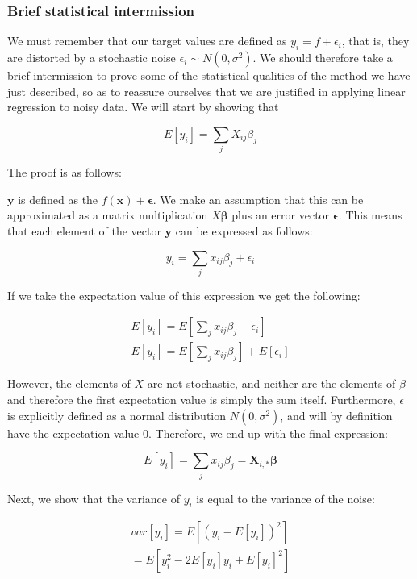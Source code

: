 \documentclass[twocolumn,10pt,cleanfoot]{asme2ej}
\begin{document}
\subsubsection{Brief statistical intermission}

We must remember that our target values are defined as $y_i = f + \epsilon_i$, that is, they are distorted by a stochastic noise $\epsilon_i \sim N(0,\sigma^2)$. We should therefore take a brief intermission to prove some of the statistical qualities of the method we have just described, so as to reassure ourselves that we are justified in applying linear regression to noisy data. We will start by showing that

\begin{equation}
E[y_i] = \sum_j X_{ij}\beta_j
\end{equation}

The proof is as follows:

$\bm{y}$ is defined as the $f(\bm{x}) + \bm{\epsilon}$. We make an assumption that this can be approximated as a matrix multiplication $X\bm{\beta}$ plus an error vector $\bm{\epsilon}$. This means that each element of the vector
$\bm{y}$ can be expressed as follows:

\begin{equation}
y_i = \sum_j x_{ij}\beta_j + \epsilon_i
\end{equation}

If we take the expectation value of this expression we get the following:

\begin{gather}
E[y_i] = E\left[\sum_j x_{ij}\beta_j + \epsilon_i\right] \\
E[y_i] = E\left[\sum_j x_{ij}\beta_j\right] + E[\epsilon_i]
\end{gather}

However, the elements of $X$ are not stochastic, and neither are the elements of $\beta$ and therefore the first expectation value is simply the sum itself. Furthermore, $\epsilon$ is explicitly defined as a normal distribution $N(0,\sigma^2)$, and will by definition have the expectation value $0$. Therefore, we end up with the final expression:

\begin{equation}
E[y_i] = \sum_j x_{ij}\beta_j = \bm{X}_{i,*}\bm{\beta}
\end{equation}

Next, we show that the variance of $y_i$ is equal to the variance of the noise:

\begin{gather}
var[y_i] = E\left[(y_i - E[y_i])^2\right]  \\
= E\left[y_i^2 - 2E[y_i]y_i + E[y_i]^2\right]
\end{gather}
\end{document}

